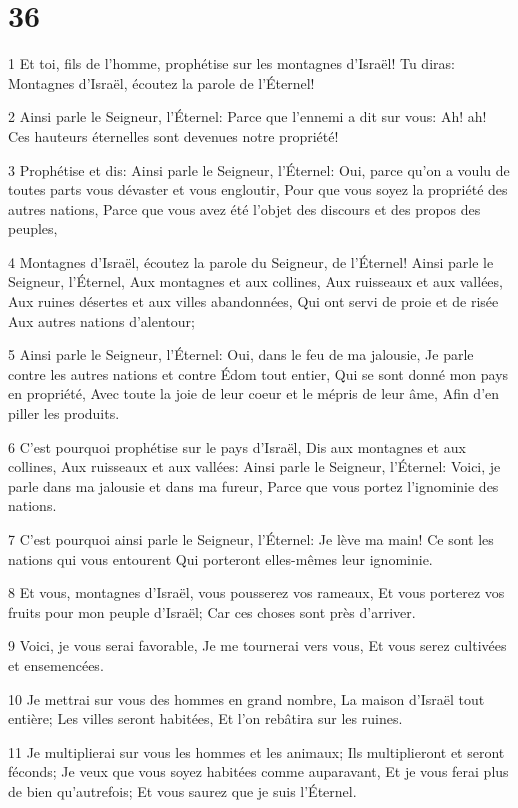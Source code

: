 \chapter{36}

\par 1 Et toi, fils de l'homme, prophétise sur les montagnes d'Israël! Tu diras: Montagnes d'Israël, écoutez la parole de l'Éternel!
\par 2 Ainsi parle le Seigneur, l'Éternel: Parce que l'ennemi a dit sur vous: Ah! ah! Ces hauteurs éternelles sont devenues notre propriété!
\par 3 Prophétise et dis: Ainsi parle le Seigneur, l'Éternel: Oui, parce qu'on a voulu de toutes parts vous dévaster et vous engloutir, Pour que vous soyez la propriété des autres nations, Parce que vous avez été l'objet des discours et des propos des peuples,
\par 4 Montagnes d'Israël, écoutez la parole du Seigneur, de l'Éternel! Ainsi parle le Seigneur, l'Éternel, Aux montagnes et aux collines, Aux ruisseaux et aux vallées, Aux ruines désertes et aux villes abandonnées, Qui ont servi de proie et de risée Aux autres nations d'alentour;
\par 5 Ainsi parle le Seigneur, l'Éternel: Oui, dans le feu de ma jalousie, Je parle contre les autres nations et contre Édom tout entier, Qui se sont donné mon pays en propriété, Avec toute la joie de leur coeur et le mépris de leur âme, Afin d'en piller les produits.
\par 6 C'est pourquoi prophétise sur le pays d'Israël, Dis aux montagnes et aux collines, Aux ruisseaux et aux vallées: Ainsi parle le Seigneur, l'Éternel: Voici, je parle dans ma jalousie et dans ma fureur, Parce que vous portez l'ignominie des nations.
\par 7 C'est pourquoi ainsi parle le Seigneur, l'Éternel: Je lève ma main! Ce sont les nations qui vous entourent Qui porteront elles-mêmes leur ignominie.
\par 8 Et vous, montagnes d'Israël, vous pousserez vos rameaux, Et vous porterez vos fruits pour mon peuple d'Israël; Car ces choses sont près d'arriver.
\par 9 Voici, je vous serai favorable, Je me tournerai vers vous, Et vous serez cultivées et ensemencées.
\par 10 Je mettrai sur vous des hommes en grand nombre, La maison d'Israël tout entière; Les villes seront habitées, Et l'on rebâtira sur les ruines.
\par 11 Je multiplierai sur vous les hommes et les animaux; Ils multiplieront et seront féconds; Je veux que vous soyez habitées comme auparavant, Et je vous ferai plus de bien qu'autrefois; Et vous saurez que je suis l'Éternel.
